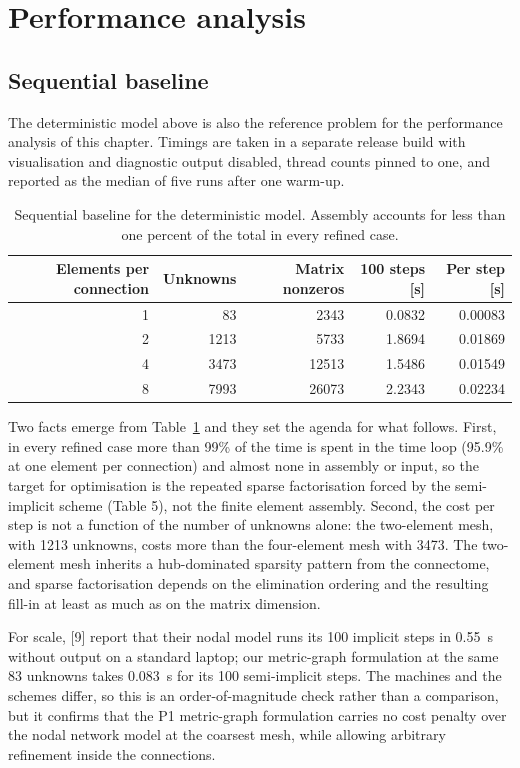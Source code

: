 \documentclass[11pt,a4paper]{article}
\begin{document}
\section{Performance analysis}

\subsection{Sequential baseline}

The deterministic model above is also the reference problem for the
performance analysis of this chapter. Timings are taken in a separate
release build with visualisation and diagnostic output disabled, thread
counts pinned to one, and reported as the median of five runs after one
warm-up.

\begin{table}[htbp]
\centering
\begin{tabular}{rrrrr}
\hline
Elements per connection & Unknowns & Matrix nonzeros & 100 steps [s] & Per step [s] \\
\hline
1 & 83   & 2343  & 0.0832 & 0.00083 \\
2 & 1213 & 5733  & 1.8694 & 0.01869 \\
4 & 3473 & 12513 & 1.5486 & 0.01549 \\
8 & 7993 & 26073 & 2.2343 & 0.02234 \\
\hline
\end{tabular}
\caption{\footnotesize Sequential baseline for the deterministic model.
Assembly accounts for less than one percent of the total in every refined
case.}
\label{tab:seqbaseline}
\end{table}

Two facts emerge from Table~\ref{tab:seqbaseline} and they set the agenda
for what follows. First, in every refined case more than 99\% of the time
is spent in the time loop (95.9\% at one element per connection) and almost
none in assembly or input, so the target for optimisation is the repeated
sparse factorisation forced by the semi-implicit scheme (Table 5), not the
finite element assembly. Second, the cost per step is not a function of the
number of unknowns alone: the two-element mesh, with 1213 unknowns, costs
more than the four-element mesh with 3473. The two-element mesh inherits a
hub-dominated sparsity pattern from the connectome, and sparse
factorisation depends on the elimination ordering and the resulting fill-in
at least as much as on the matrix dimension.

For scale, [9] report that their nodal model runs its 100 implicit steps in
0.55~s without output on a standard laptop; our metric-graph formulation at
the same 83 unknowns takes 0.083~s for its 100 semi-implicit steps. The
machines and the schemes differ, so this is an order-of-magnitude check
rather than a comparison, but it confirms that the P1 metric-graph
formulation carries no cost penalty over the nodal network model at the
coarsest mesh, while allowing arbitrary refinement inside the connections.
\end{document}
